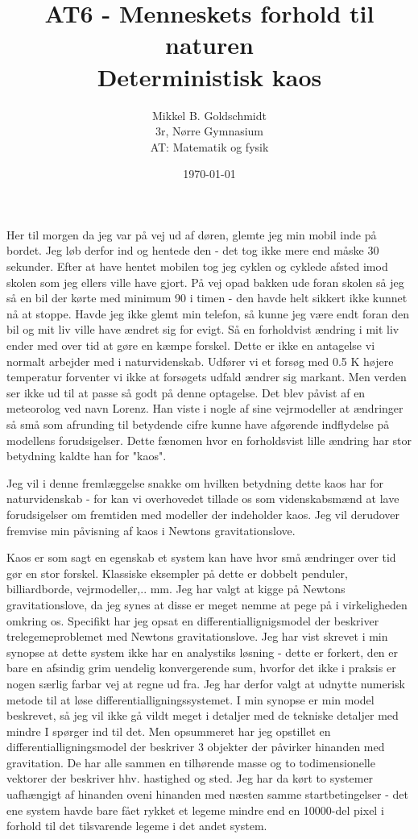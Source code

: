 \documentclass[12pt,a4paper]{article}
\author{Mikkel B. Goldschmidt\\ 3r, Nørre Gymnasium \\ AT: Matematik og fysik}
\title{AT6 - Menneskets forhold til naturen \\ Deterministisk kaos}
\date{\today}
\theoremstyle{break}
\theoremstyle{nonumberplain}
\begin{document}
\maketitle
Her til morgen da jeg var på vej ud af døren, glemte jeg min mobil inde på bordet. 
Jeg løb derfor ind og hentede den - det tog ikke mere end måske 30 sekunder. 
Efter at have hentet mobilen tog jeg cyklen og cyklede afsted imod skolen som jeg ellers ville have gjort. 
På vej opad bakken ude foran skolen så jeg så en bil der kørte med minimum 90 i timen -  den havde helt sikkert ikke kunnet nå at stoppe. 
Havde jeg ikke glemt min telefon, så kunne jeg være endt foran den bil og mit liv ville have ændret sig for evigt.
Så en forholdvist ændring i mit liv ender med over tid at gøre en kæmpe forskel. 
Dette er ikke en antagelse vi normalt arbejder med i naturvidenskab. 
Udfører vi et forsøg med 0.5 K højere temperatur forventer vi ikke at forsøgets udfald ændrer sig markant. 
Men verden ser ikke ud til at passe så godt på denne optagelse. 
Det blev påvist af en meteorolog ved navn Lorenz. 
Han viste i nogle af sine vejrmodeller at ændringer så små som afrunding til betydende cifre kunne have afgørende indflydelse på modellens forudsigelser. 
Dette fænomen hvor en forholdsvist lille ændring har stor betydning kaldte han for "kaos". 

Jeg vil i denne fremlæggelse snakke om hvilken betydning dette kaos har for naturvidenskab - for kan vi overhovedet tillade os som videnskabsmænd at lave forudsigelser om fremtiden med modeller der indeholder kaos. 
Jeg vil derudover fremvise min påvisning af kaos i Newtons gravitationslove.

Kaos er som sagt en egenskab et system kan have hvor små ændringer over tid gør en stor forskel. 
Klassiske eksempler på dette er dobbelt penduler, billiardborde, vejrmodeller,.. mm.
Jeg har valgt at kigge på Newtons gravitationslove, da jeg synes at disse er meget nemme at pege på i virkeligheden omkring os. 
Specifikt har jeg opsat en differentiallignigsmodel der beskriver trelegemeproblemet med Newtons gravitationslove. 
Jeg har vist skrevet i min synopse at dette system ikke har en analystiks løsning - dette er forkert, den er bare en afsindig grim uendelig konvergerende sum, hvorfor det ikke i praksis er nogen særlig farbar vej at regne ud fra. 
Jeg har derfor valgt at udnytte numerisk metode til at løse differentialligningssystemet. 
I min synopse er min model beskrevet, så jeg vil ikke gå vildt meget i detaljer med de tekniske detaljer med mindre I spørger ind til det. 
Men opsummeret har jeg opstillet en differentialligningsmodel der beskriver 3 objekter der påvirker hinanden med gravitation. 
De har alle sammen en tilhørende masse og to todimensionelle vektorer der beskriver hhv. hastighed og sted. 
Jeg har da kørt to systemer uafhængigt af hinanden oveni hinanden med næsten samme startbetingelser - det ene system havde bare fået rykket et legeme mindre end en 10000-del pixel i forhold til det tilsvarende legeme i det andet system.
\end{document}
